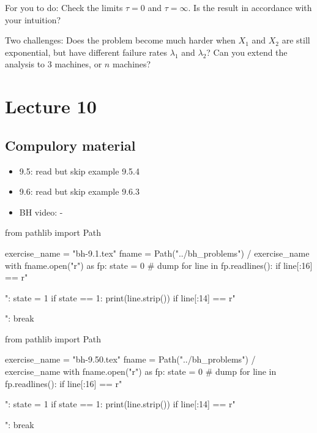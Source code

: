\begin{exercise}
\begin{solution}
For you to do: Check the limits $\tau=0$ and $\tau=\infty$. Is the result in accordance with your intuition?

Two challenges: Does the problem become much harder when $X_{1}$ and $X_{2}$ are still exponential, but have different failure rates $\lambda_1$ and $\lambda_{2}$? Can you extend the analysis to 3 machines, or $n$ machines?

\end{solution}
\end{exercise}



\section{Lecture 10}

\subsection{Compulory material}
\label{sec:compulory-material}


\begin{itemize}
\item 9.5: read but skip example 9.5.4
\item 9.6: read but skip example 9.6.3
\item BH video: -
\end{itemize}


\begin{pycode}
from pathlib import Path

exercise_name = "bh-9.1.tex"
fname = Path("../bh_problems") / exercise_name
with fname.open("r") as fp:
    state = 0  # dump
    for line in fp.readlines():
        if line[:16] == r"\begin{exercise}":
            state = 1
        if state == 1:
            print(line.strip())
        if line[:14] == r"\end{exercise}":
            break
\end{pycode}


\begin{pycode}
from pathlib import Path

exercise_name = "bh-9.50.tex"
fname = Path("../bh_problems") / exercise_name
with fname.open("r") as fp:
    state = 0  # dump
    for line in fp.readlines():
        if line[:16] == r"\begin{exercise}":
            state = 1
        if state == 1:
            print(line.strip())
        if line[:14] == r"\end{exercise}":
            break
\end{pycode}


